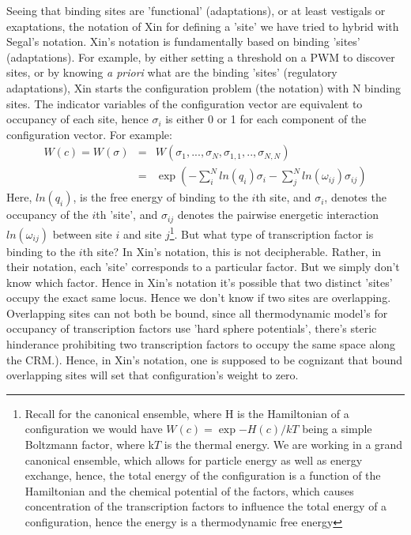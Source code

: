 Seeing that binding sites are 'functional' (adaptations), or at least vestigals or exaptations, the notation of Xin for defining a 'site' we have tried to hybrid with Segal's notation.  Xin's notation is fundamentally based on binding 'sites' (adaptations).  For example, by either setting a threshold on a PWM to discover sites, or by knowing \textit{a priori} what are the binding 'sites' (regulatory adaptations), Xin starts the configuration problem (the notation) with N binding sites.  The indicator variables of the configuration vector are equivalent to occupancy of each site, hence $\sigma_i$ is either 0 or 1 for each component of the configuration vector.  For example:
\begin{eqnarray}
W(c)=W(\sigma)&=& W(\sigma_1,...,\sigma_{N} , \sigma_{1,1},..,\sigma_{N,N})\\
&=& \exp{(-\sum_i^N ln(q_i) \sigma_i - \sum_j^N ln(\omega_{ij}) \sigma_{ij})}
\end{eqnarray}
Here, $ln(q_i)$, is the free energy of binding to the $i$th site, and $\sigma_{i}$, denotes the occupancy of the $i$th 'site', and $\sigma_{ij}$ denotes the pairwise energetic interaction $ln(\omega_{ij})$ between site $i$ and site $j$\footnote{Recall for the canonical ensemble, where H is the Hamiltonian of a configuration we would have  $W(c) = \exp{-H(c)/kT}$ being a simple Boltzmann factor, where k$T$ is the thermal energy.  We are working in a grand canonical ensemble, which allows for particle energy as well as energy exchange, hence, the total energy of the configuration is a function of the Hamiltonian and the chemical potential of the factors, which causes concentration of the transcription factors to influence the total energy of a configuration, hence the energy is a thermodynamic free energy}.  But what type of transcription factor is binding to the $i$th site?  In Xin's notation, this is not decipherable.  Rather, in their notation, each 'site' corresponds to a particular factor.  But we simply don't know which factor.  Hence in Xin's notation it's possible that two distinct 'sites' occupy the exact same locus.  Hence we don't know if two sites are overlapping.  Overlapping sites can not both be bound, since all thermodynamic model's for occupancy of transcription factors use 'hard sphere potentials', there's steric hinderance prohibiting two transcription factors to occupy the same space along the CRM.).  Hence, in Xin's notation, one is supposed to be cognizant that bound overlapping sites will set that configuration's weight to zero. 

